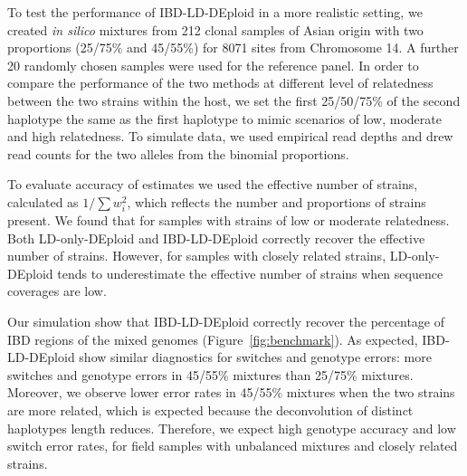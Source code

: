 \documentclass{article}
\begin{document}
To test the performance of IBD-LD-DEploid in a more realistic setting, we created {\it in silico} mixtures from 212 clonal samples of Asian origin with two proportions (25/75\% and 45/55\%) for 8071 sites from Chromosome 14. A further 20 randomly chosen samples were used for the reference panel. In order to compare the performance of the two methods at different level of relatedness between the two strains within the host, we set the first 25/50/75\% of the second haplotype the same as the first haplotype to mimic scenarios of low, moderate and high relatedness. To simulate data, we used empirical read depths and drew read counts for the two alleles from the binomial proportions.

To evaluate accuracy of estimates we used the effective number of strains, calculated as $1/\sum w_{i}^{2}$, which reflects the number and proportions of strains present. We found that for samples with strains of low or moderate relatedness. Both LD-only-DEploid and IBD-LD-DEploid correctly recover the effective number of strains. However, for samples with closely related strains, LD-only-DEploid tends to underestimate the effective number of strains when sequence coverages are low.

Our simulation show that IBD-LD-DEploid correctly recover the percentage of IBD regions of the mixed genomes (Figure~\ref{fig:benchmark}). As expected, IBD-LD-DEploid show similar diagnostics for switches and genotype errors: more switches and genotype errors in 45/55\% mixtures than 25/75\% mixtures. Moreover, we observe lower error rates in 45/55\% mixtures when the two strains are more related, which is expected because the deconvolution of distinct haplotypes length reduces. Therefore, we expect high genotype accuracy and low switch error rates, for field samples with unbalanced mixtures and closely related strains.
\end{document}
